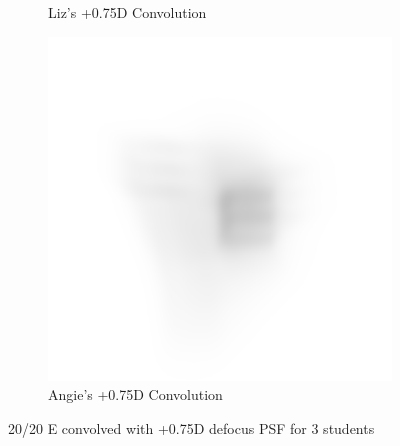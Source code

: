 \documentclass{article}
\begin{document}
\begin{figure}[H]
\begin{subfigure}{.3\textwidth}
  \caption{Liz's +0.75D Convolution}
  \label{fig:liz075d}
\end{subfigure}
\begin{subfigure}{.3\textwidth}
  \centering
  \includegraphics[width=1\linewidth]{Angie_R_0526_1_500_zer_075_5_PSF_convE.png}
  \caption{Angie's +0.75D Convolution}
  \label{fig:angie075d}
\end{subfigure}

\caption{20/20 E convolved with +0.75D defocus PSF for 3 students}
\label{fig:Defocus_075D}
\end{figure}

\clearpage
\end{document}
